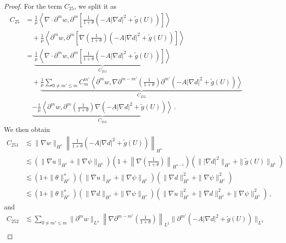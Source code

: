 \documentclass[reqno,11pt]{amsart}
\numberwithin{equation}{section}
\begin{document}
\begin{proof}
For the term $C_{25}$, we split it as
\begin{align*}
C_{25} & = \frac{1}{\mu} \left\langle \nabla \cdot \partial^m w, \partial^m \left[ \frac{1}{1+\theta} (-A | \nabla d |^2 + \tilde{g}(U)) \right] \right\rangle \\
&\quad + \frac{1}{\mu} \left\langle \partial^m w, \partial^m \left[ \nabla \left(\frac{1}{1+\theta}\right) (-A | \nabla d |^2 + \tilde{g}(U)) \right] \right\rangle \\
&= \underset{C_{251}}{\underbrace{\frac{1}{\mu} \left\langle \nabla \cdot \partial^m w, \partial^m \left[ \frac{1}{1+\theta} (-A | \nabla d |^2 + \tilde{g}(U)) \right] \right\rangle}} \\
&\quad +\underset{C_{252}}{\underbrace{ \frac{1}{\mu} \sum_{0 \neq m' \leq m} C_m^{m'} \left\langle \partial^m w, \nabla \partial^{m-m'} \left(\frac{1}{1+\theta}\right) \partial^{m'} (-A | \nabla d |^2 + \tilde{g}(U)) \right\rangle}}{} \\
&\quad \underset{C_{253}}{\underbrace{- \frac{1}{\mu} \left\langle \partial^m w, \partial^m \left(\frac{1}{1+\theta}\right) \nabla (-A | \nabla d |^2 + \tilde{g}(U)) \right\rangle}} \,.
\end{align*}
We then obtain 
\begin{equation*}
\begin{aligned}
C_{251}&\lesssim\| \nabla w \|_{H^s} \left\| \frac{1}{1+\theta} (-A | \nabla d |^2 + \tilde{g}(U)) \right\|_{H^s} \\&
\lesssim ( \| \nabla u \|_{H^s} + \| \nabla \psi \|_{H^s} ) ( 1 + \left\| \nabla \left(\frac{1}{1+\theta}\right) \right\|_{H^{s-1}} ) ( \| |\nabla d|^2 \|_{H^s} + \| \tilde{g}(U) \|_{H^s} ) \\&
\lesssim( 1 + \| \theta \|_{H^s}^s ) ( \| \nabla u \|_{H^s} + \| \nabla \psi \|_{H^s} ) ( \| \nabla d \|_{H^s}^2 + \| \nabla \psi \|_{H^s}^2 ) \\&
\lesssim ( 1 + \| \theta \|_{H^s}^s ) ( \| \nabla d \|_{H^s} + \| \nabla \psi \|_{H^s} ) ( \| \nabla u \|_{H^s}^2 + \| \nabla d \|_{H^s}^2 + \| \nabla \psi \|_{H^s}^2 )
\,,
\end{aligned}
\end{equation*}
and
\begin{equation*}
\begin{aligned}
C_{252}&\lesssim\sum_{0\neq m' \leq m} \| \partial^m w \|_{L^4} \left\| \nabla \partial^{m-m'} \left(\frac{1}{1+\theta}\right) \right\|_{L^2} \| \partial^{m'} (-A | \nabla d |^2 + \tilde{g}(U)) \|_{L^4} \\

\end{aligned}
\end{equation*}
\end{proof}
\end{document}
